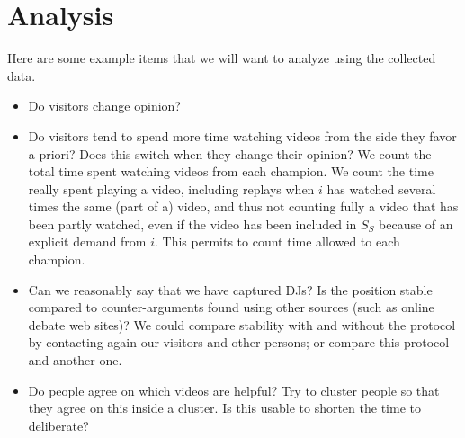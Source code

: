 \documentclass[version=3.21, pagesize, twoside=off, bibliography=totoc, DIV=calc, fontsize=12pt, a4paper]{scrartcl}
\begin{document}
\section{Analysis}
Here are some example items that we will want to analyze using the collected data.
\begin{itemize}
	\item Do visitors change opinion?
	\item Do visitors tend to spend more time watching videos from the side they favor a priori? Does this switch when they change their opinion? We count the total time spent watching videos from each champion. We count the time really spent playing a video, including replays when $i$ has watched several times the same (part of a) video, and thus not counting fully a video that has been partly watched, even if the video has been included in $S_S$ because of an explicit demand from $i$. This permits to count time allowed to each champion.
	\item Can we reasonably say that we have captured \acp{DJ}? Is the position stable compared to counter-arguments found using other sources (such as online debate web sites)? We could compare stability with and without the protocol by contacting again our visitors and other persons; or compare this protocol and another one.
	\item Do people agree on which videos are helpful? Try to cluster people so that they agree on this inside a cluster. Is this usable to shorten the time to deliberate?
\end{itemize}



\end{document}
